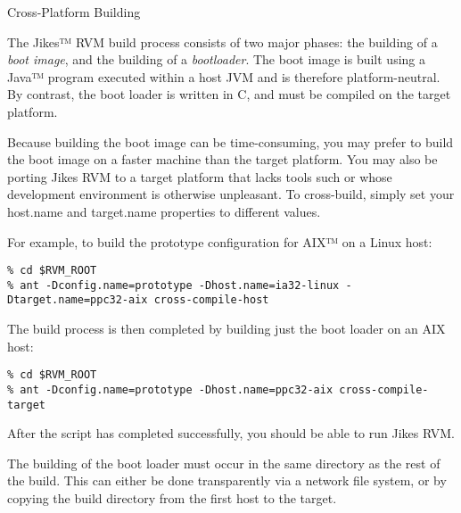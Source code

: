 \begin{section}{Cross-Platform Building}
\label{sec:crossplatformbuilding}

The Jikes™ RVM build process consists of two major phases: the building of a \textit{boot image}, and the building of a \textit{bootloader}. The boot image is built using a Java™ program executed within a host JVM and is therefore platform-neutral. By contrast, the boot loader is written in C, and must be compiled on the target platform.

Because building the boot image can be time-consuming, you may prefer to build the boot image on a faster machine than the target platform. You may also be porting Jikes RVM to a target platform that lacks tools such or whose development environment is otherwise unpleasant. To cross-build, simply set your host.name and target.name properties to different values.

For example, to build the prototype configuration for AIX™ on a Linux host:
\begin{lstlisting}
% cd $RVM_ROOT
% ant -Dconfig.name=prototype -Dhost.name=ia32-linux -Dtarget.name=ppc32-aix cross-compile-host
\end{lstlisting}

The build process is then completed by building just the boot loader on an AIX host:
\begin{lstlisting}
% cd $RVM_ROOT
% ant -Dconfig.name=prototype -Dhost.name=ppc32-aix cross-compile-target
\end{lstlisting}

After the script has completed successfully, you should be able to run Jikes RVM.

The building of the boot loader must occur in the same directory as the rest of the build. This can either be done transparently via a network file system, or by copying the build directory from the first host to the target. 

\end{section}
